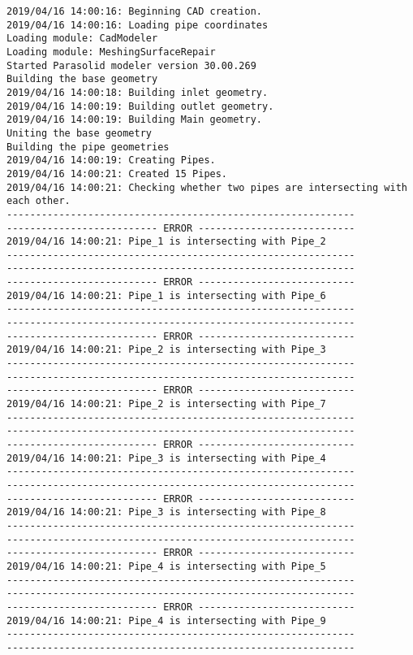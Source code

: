 \documentclass{article}
\begin{document}
{\tiny 
\begin{verbatim}
2019/04/16 14:00:16: Beginning CAD creation.
2019/04/16 14:00:16: Loading pipe coordinates
Loading module: CadModeler
Loading module: MeshingSurfaceRepair
Started Parasolid modeler version 30.00.269
Building the base geometry
2019/04/16 14:00:18: Building inlet geometry.
2019/04/16 14:00:19: Building outlet geometry.
2019/04/16 14:00:19: Building Main geometry.
Uniting the base geometry
Building the pipe geometries
2019/04/16 14:00:19: Creating Pipes.
2019/04/16 14:00:21: Created 15 Pipes.
2019/04/16 14:00:21: Checking whether two pipes are intersecting with each other.
------------------------------------------------------------
-------------------------- ERROR ---------------------------
2019/04/16 14:00:21: Pipe_1 is intersecting with Pipe_2
------------------------------------------------------------
------------------------------------------------------------
-------------------------- ERROR ---------------------------
2019/04/16 14:00:21: Pipe_1 is intersecting with Pipe_6
------------------------------------------------------------
------------------------------------------------------------
-------------------------- ERROR ---------------------------
2019/04/16 14:00:21: Pipe_2 is intersecting with Pipe_3
------------------------------------------------------------
------------------------------------------------------------
-------------------------- ERROR ---------------------------
2019/04/16 14:00:21: Pipe_2 is intersecting with Pipe_7
------------------------------------------------------------
------------------------------------------------------------
-------------------------- ERROR ---------------------------
2019/04/16 14:00:21: Pipe_3 is intersecting with Pipe_4
------------------------------------------------------------
------------------------------------------------------------
-------------------------- ERROR ---------------------------
2019/04/16 14:00:21: Pipe_3 is intersecting with Pipe_8
------------------------------------------------------------
------------------------------------------------------------
-------------------------- ERROR ---------------------------
2019/04/16 14:00:21: Pipe_4 is intersecting with Pipe_5
------------------------------------------------------------
------------------------------------------------------------
-------------------------- ERROR ---------------------------
2019/04/16 14:00:21: Pipe_4 is intersecting with Pipe_9
------------------------------------------------------------
------------------------------------------------------------

\end{verbatim}}
\end{document}
